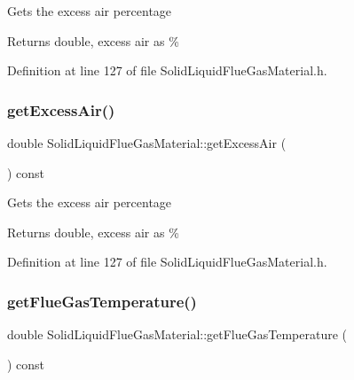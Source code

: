 Gets the excess air percentage \begin{DoxyReturn}{Returns}
double, excess air as \% 
\end{DoxyReturn}


Definition at line 127 of file Solid\+Liquid\+Flue\+Gas\+Material.\+h.

\mbox{\label{class_solid_liquid_flue_gas_material_a49e7bb4ebc45897c81b6f38610ceaf02}} 
\subsubsection{\texorpdfstring{get\+Excess\+Air()}{getExcessAir()}\hspace{0.1cm}{\footnotesize\ttfamily [3/3]}}
{\footnotesize\ttfamily double Solid\+Liquid\+Flue\+Gas\+Material\+::get\+Excess\+Air (\begin{DoxyParamCaption}{ }\end{DoxyParamCaption}) const\hspace{0.3cm}{\ttfamily [inline]}}

Gets the excess air percentage \begin{DoxyReturn}{Returns}
double, excess air as \% 
\end{DoxyReturn}


Definition at line 127 of file Solid\+Liquid\+Flue\+Gas\+Material.\+h.

\mbox{\label{class_solid_liquid_flue_gas_material_aba4604158b3c624496d7de4b5fb511e2}} 
\subsubsection{\texorpdfstring{get\+Flue\+Gas\+Temperature()}{getFlueGasTemperature()}\hspace{0.1cm}{\footnotesize\ttfamily [1/3]}}
{\footnotesize\ttfamily double Solid\+Liquid\+Flue\+Gas\+Material\+::get\+Flue\+Gas\+Temperature (\begin{DoxyParamCaption}{ }\end{DoxyParamCaption}) const\hspace{0.3cm}{\ttfamily [inline]}}

